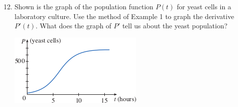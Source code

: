 \documentclass[12pt]{article}
\begin{document}
\begin{enumerate}
    \setcounter{enumi}{11}
    \item Shown is the graph of the population function $P(t)$ for yeast cells in a laboratory culture. Use the method of Example 1 to graph the derivative $P'(t)$. What does the graph of $P'$ tell us about the yeast population?
          \begin{center}
              \includegraphics{Images/Image-3.png}
          \end{center}
          \begin{figure}[!h]
              \begin{framed}
                  \centering
              \end{framed}
          \end{figure}

          \noindent{}
\end{enumerate}
\end{document}
